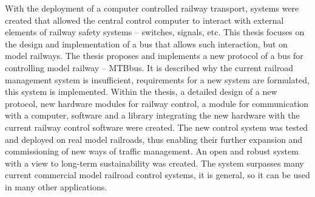 With the deployment of a computer controlled railway transport, systems were
created that allowed the central control computer to interact with external
elements of railway safety systems – switches, signals, etc. This thesis
focuses on the design and implementation of a bus that allows such interaction,
but on model railways. The thesis proposes and implements a new protocol of
a bus for controlling model railway – MTBbus. It is described why the current
railroad management system is insufficient, requirements for a new system are
formulated, this system is implemented. Within the thesis, a detailed design of a
new protocol, new hardware modules for railway control, a module for
communication with a computer, software and a library integrating the new
hardware with the current railway control software were created. The new
control system was tested and deployed on real model railroads, thus enabling
their further expansion and commissioning of new ways of traffic management. An
open and robust system with a view to long-term sustainability was created. The
system surpasses many current commercial model railroad control systems, it is
general, so it can be used in many other applications.

